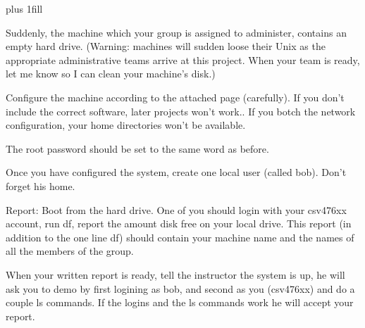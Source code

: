
\rightskip=0pt plus 1fill

\parindent 0pt

Suddenly, the machine which your group is assigned to administer,
contains an empty hard drive.
(Warning: machines will sudden loose their Unix as the appropriate
administrative teams arrive at this project.
When your team is ready, let me know so I can clean your machine's disk.)

Configure the machine according to the attached page (carefully).
If you don't include the correct software, later projects won't work..
If you botch the network configuration, your home directories won't
be available.

The root password should be set to the same word as before.

Once you have configured the system, create one local user (called bob).
Don't forget his home.

Report: Boot from the hard drive.
One of you should login with your csv476xx account, run df, 
report the amount disk free on your local drive.
This report (in addition to the one line df) should contain your machine
name and the names of all the members of the group.

When your written report is ready,
tell the instructor the system is up,
he will ask you to demo by first logining as bob, and second as
you (csv476xx) and do a couple {\ltt{}ls} commands.
If the logins and the {\ltt{}ls} commands work he will accept your report.
\bye
